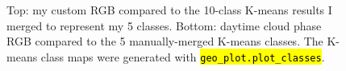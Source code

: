\documentclass[12pt]{article}
\newcommand{\hltexttt}[1]{\texttt{\hl{#1}}}
\begin{document}
\begin{figure}[h!]
\begin{center}
    \end{center}

    \caption{Top: my custom RGB compared to the 10-class K-means results I merged to represent my 5 classes. Bottom: daytime cloud phase RGB compared to the 5 manually-merged K-means classes. The K-means class maps were generated with \hltexttt{geo\_plot.plot\_classes}.}
    \label{10c_comparison}
\end{figure}
\end{document}
